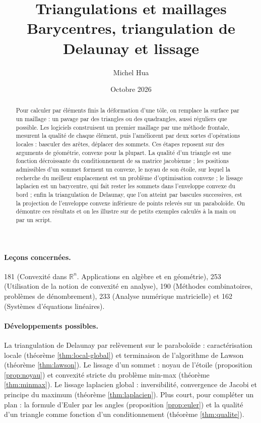 \documentclass[11pt,a4paper]{article}
\title{Triangulations et maillages\\[2pt]
\large Barycentres, triangulation de Delaunay et lissage}
\author{Michel Hua}
\date{Octobre 2026}
\theoremstyle{plain}
\theoremstyle{definition}
\theoremstyle{remark}
\newcommand{\R}{\mathbb{R}}
\begin{document}
\maketitle

\begin{abstract}
Pour calculer par éléments finis la déformation d'une tôle, on remplace la surface par un maillage : un pavage par des triangles ou des quadrangles, aussi réguliers que possible. Les logiciels construisent un premier maillage par une méthode frontale, mesurent la qualité de chaque élément, puis l'améliorent par deux sortes d'opérations locales : basculer des arêtes, déplacer des sommets. Ces étapes reposent sur des arguments de géométrie, convexe pour la plupart. La qualité d'un triangle est une fonction décroissante du conditionnement de sa matrice jacobienne ; les positions admissibles d'un sommet forment un convexe, le noyau de son étoile, sur lequel la recherche du meilleur emplacement est un problème d'optimisation convexe ; le lissage laplacien est un barycentre, qui fait rester les sommets dans l'enveloppe convexe du bord ; enfin la triangulation de Delaunay, que l'on atteint par bascules successives, est la projection de l'enveloppe convexe inférieure de points relevés sur un paraboloïde. On démontre ces résultats et on les illustre sur de petits exemples calculés à la main ou par un script.
\end{abstract}

\paragraph{Leçons concernées.} 181 (Convexité dans $\R^n$. Applications en algèbre et en géométrie), 253 (Utilisation de la notion de convexité en analyse), 190 (Méthodes combinatoires, problèmes de dénombrement), 233 (Analyse numérique matricielle) et 162 (Systèmes d'équations linéaires).

\paragraph{Développements possibles.} La triangulation de Delaunay par relèvement sur le paraboloïde : caractérisation locale (théorème \ref{thm:local-global}) et terminaison de l'algorithme de Lawson (théorème \ref{thm:lawson}). Le lissage d'un sommet : noyau de l'étoile (proposition \ref{prop:noyau}) et convexité stricte du problème min-max (théorème \ref{thm:minmax}). Le lissage laplacien global : inversibilité, convergence de Jacobi et principe du maximum (théorème \ref{thm:laplacien}). Plus court, pour compléter un plan : la formule d'Euler par les angles (proposition \ref{prop:euler}) et la qualité d'un triangle comme fonction d'un conditionnement (théorème \ref{thm:qualite}).
\end{document}
